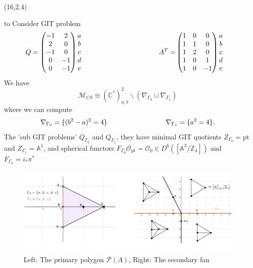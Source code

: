 \documentclass[a0]{a0poster}
\def\Head#1{\noindent\hbox to \hsize{\hfil{\LARGE\color{DarkBlue}\sf #1}}\bigskip}
\begin{document}
\begin{textblock}{7}(16,2.4)

\Head{Rank 2 Example}
\sf
Consider GIT problem
\begin{align*}
Q = \begin{pmatrix}
  -1 & 2 \\
  2 & 0 \\
  -1 & 0 \\
  0 & -1 \\
  0 & -1
\end{pmatrix}
\begin{matrix}
  a \\
  b\\
  c\\
  d\\
  e
\end{matrix}
\hspace*{4cm}
A^T = &\begin{pmatrix}
 1 & 0 & 0 \\
 1 & 1 & 0 \\
 1 & 2 & 0 \\
 1 & 0 & 1 \\
 1 & 0 & -1
\end{pmatrix}
\begin{matrix}
  a \\
  b\\
  c\\
  d\\
  e
\end{matrix}
\end{align*}
We have $$\mathcal{M}_{CS} \cong (\mathbb{C}^{*})^2_{a,b}\backslash \left(\nabla_{\Gamma_0} \cup \nabla_{\Gamma_1} \right) $$
where we can compute
$$
\nabla_{\Gamma_0} = \{(b^2-a)^2 = 4\} \hspace*{3cm} \nabla_{\Gamma_1} = \{ a^2 = 4\}.
$$
The 'sub GIT problems' $Q_{\Gamma_0}$ and $Q_{\Gamma_1}$, they have minimal GIT quotients $Z_{\Gamma_0} = \text{pt}$ and $Z_{\Gamma_1}= \mathbb{A}^1$, and spherical functors $F_{\Gamma_0} \mathcal{O}_{\text{pt}} = \mathcal{O}_{0} \in D^b(\left[ \mathbb{A}^3 / \mathbb{Z}_4 \right])$ and $F_{\Gamma_0} = i_{*} \pi^{*}$


\begin{figure}
  \centering
  \includegraphics[width=25cm]{rank2.png}
  \caption{Left: The primary polygon $\mathcal{P}(A)$, Right: The secondary fan}
\end{figure}


\end{textblock}
\end{document}
